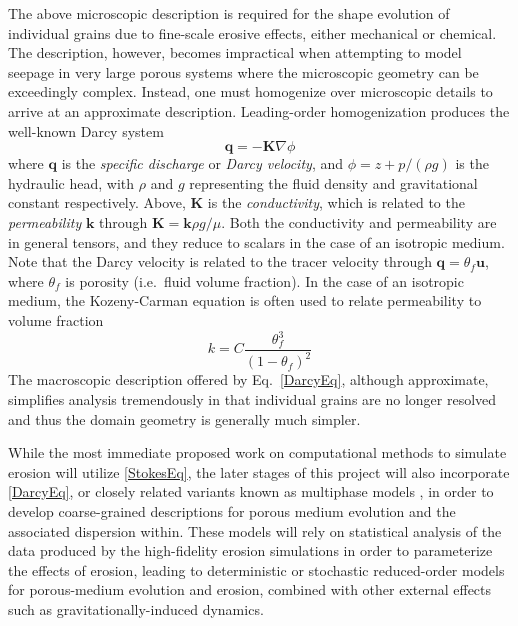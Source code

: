 \documentclass[11pt]{article}
\newcommand{\bvec}[1]{{\mathbf{#1}}}
\newcommand{\grad}{\nabla}
\newcommand{\uu}{\bvec{u}}
\newcommand {\qq} {\bvec{q}}
\begin{document}
	The above microscopic description is required for the shape evolution of individual grains due to fine-scale erosive effects, either mechanical or chemical. The description, however, becomes impractical when attempting to model seepage in very large porous systems where the microscopic geometry can be exceedingly complex. Instead, one must homogenize over microscopic details to arrive at an approximate description. Leading-order homogenization produces the well-known Darcy system
\begin{equation}
\label{DarcyEq}
\qq = - \bvec{K} \grad \phi
\end{equation}
where $\qq$ is the {\em specific discharge} or {\em Darcy velocity}, and $\phi = z + p/(\rho g)$ is the hydraulic head, with $\rho$ and $g$ representing the fluid density and gravitational constant respectively. Above, $\bvec{K}$ is the {\em conductivity}, which is related to the {\em permeability} $\bvec{k}$ through $\bvec{K} = \bvec{k} \rho g/\mu$. Both the conductivity and permeability are in general tensors, and they reduce to scalars in the case of an isotropic medium.
Note that the Darcy velocity is related to the tracer velocity through $\qq = \theta_f \uu$, where $\theta_f$ is porosity (i.e.~fluid volume fraction).
In the case of an isotropic medium, the Kozeny-Carman equation is often used to relate permeability to volume fraction \cite{bear2013dynamics}
\begin{equation}
k = C \frac{\theta_f^3}{(1-\theta_f)^2}
\end{equation}
The macroscopic description offered by Eq.~\eqref{DarcyEq}, although approximate, simplifies analysis tremendously in that individual grains are no longer resolved and thus the domain geometry is generally much simpler.

While the most immediate proposed work on computational methods to simulate erosion will utilize \eqref{StokesEq}, the later stages of this project will also incorporate \eqref{DarcyEq}, or closely related variants known as multiphase models \cite{Imma2019, eastham2019multiphase}, in order to develop coarse-grained descriptions for porous medium evolution and the associated dispersion within. These models will rely on statistical analysis of the data produced by the high-fidelity erosion simulations in order to parameterize the effects of erosion, leading to deterministic or stochastic reduced-order models for porous-medium evolution and erosion, combined with other external effects such as gravitationally-induced dynamics.
\end{document}
